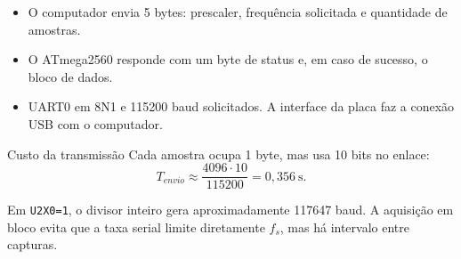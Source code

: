 \begin{itemize}
\item O computador envia 5 bytes: prescaler, frequência solicitada e quantidade de amostras.
\item O ATmega2560 responde com um byte de status e, em caso de sucesso, o bloco de dados.
\item UART0 em 8N1 e 115200 baud solicitados. A interface da placa faz a conexão USB com o computador.
\end{itemize}
\begin{block}{Custo da transmissão}
Cada amostra ocupa 1 byte, mas usa 10 bits no enlace:
\[
T_{envio}\approx\frac{4096\cdot10}{115200}=0{,}356\ \text{s}.
\]
\end{block}
\small Em \texttt{U2X0=1}, o divisor inteiro gera aproximadamente 117647 baud. A aquisição em bloco evita que a taxa serial limite diretamente $f_s$, mas há intervalo entre capturas.
